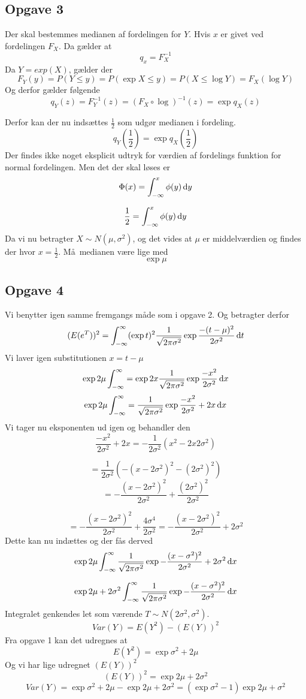 \subsection{Opgave 3}

Der skal bestemmes medianen af fordelingen for $Y$. Hvis $x$ er givet ved fordelingen $F_{X}$. Da g\ae lder at
\[
q_x = F_{X}^{-1}
\]
Da $Y = exp(X)$, g\ae lder der
\[
F_{Y}(y) = P(Y \leq y) = P(\exp{X} \leq y) = P(X \leq \log{Y}) = F_{X}(\log{Y})
\]
Og derfor g\ae lder f\o lgende
\[
q_{Y}(z) = F_{Y}^{-1}(z) = (F_{X} \circ \log)^{-1}(z) = \exp{q_{X}(z)} 
\]

Derfor kan der nu inds\ae ttes $\frac{1}{2}$ som udg\o r medianen i fordeling.
\[
q_{Y}(\frac{1}{2}) = \exp{q_{X}(\frac{1}{2})}
\]
Der findes ikke noget eksplicit udtryk for v\ae rdien af fordelings funktion for normal fordelingen. Men det der skal l\o ses er
\[
\Phi (x) = \int_{-\infty}^{x} \phi (y) \, \mathrm{d} y
\]

\[
\frac{1}{2} = \int_{-\infty}^{x} \phi(y) \, \mathrm{d} y
\]
Da vi nu betragter $X \sim N(\mu, \sigma^2)$, og det vides at $\mu$ er middelv\ae rdien og findes der hvor $x = \frac{1}{2}$. M\aa\ medianen v\ae re lige med
\[
\exp{\mu}
\]

\subsection{Opgave 4}

Vi benytter igen samme fremgangs m\aa de som i opgave 2. Og betragter derfor
\[
(E(e^{T}))^2 = \int_{-\infty}^{\infty} (\exp{t})^{2} \frac{1}{\sqrt{2\pi\sigma^{2}}} \exp{\frac{-(t - \mu)^{2}}{2\sigma^{2}}} \, \mathrm{d} t
\]
Vi laver igen substitutionen $x = t - \mu$
\[
\exp{2\mu} \int_{-\infty}^{\infty} = \exp{2x} \frac{1}{\sqrt{2\pi\sigma^{2}}} \exp{\frac{-x^{2}}{2\sigma^{2}}} \, \mathrm{d} x
\]
\[
\exp{2\mu} \int_{-\infty}^{\infty} = \frac{1}{\sqrt{2\pi\sigma^{2}}} \exp{\frac{-x^{2}}{2\sigma^{2}}+2x} \, \mathrm{d} x
\]
Vi tager nu eksponenten ud igen og behandler den
\[
\frac{-x^{2}}{2\sigma^{2}}+2x = -\frac{1}{2\sigma^2}\left( x^2 - 2x2\sigma^2 \right)
\]

\[
= \frac{1}{2\sigma^2}\left( -\left(x - 2\sigma^2 \right)^2 - \left( 2\sigma^2 \right)^2 \right)
\]
\[
= -\frac{(x - 2\sigma^2)^2}{2\sigma^2} + \frac{(2\sigma^2)^2}{2\sigma^2}
\]

\[
= -\frac{(x - 2\sigma^2)^2}{2\sigma^2} + \frac{4\sigma^4}{2\sigma^2} = -\frac{(x-2\sigma^2)^2}{2\sigma^2} + 2\sigma^2
\]
Dette kan nu ind\ae ttes og der f\aa s derved
\[
\exp{2\mu} \int_{-\infty}^{\infty} \frac{1}{\sqrt{2\pi\sigma^{2}}} \exp{-\frac{(x-\sigma^2)^2}{2\sigma^2} + 2\sigma^2} \, \mathrm{d} x
\]

\[
\exp{2\mu+2\sigma^2} \int_{-\infty}^{\infty} \frac{1}{\sqrt{2\pi\sigma^{2}}} \exp{-\frac{(x-\sigma^2)^2}{2\sigma^2}} \, \mathrm{d} x
\]
Integralet genkendes let som v\ae rende $T \sim N(2\sigma^2, \sigma^2)$.
\[
Var(Y) = E(Y^2) - (E(Y))^2
\]
Fra opgave 1 kan det udregnes at 
\[
E(Y^2) = \exp{\sigma^2 + 2\mu}
\]
Og vi har lige udregnet $(E(Y))^2$
\[
(E(Y))^2 = \exp{2\mu+2\sigma^2}
\]
\[
Var(Y) = \exp{\sigma^2 + 2\mu} - \exp{2\mu+2\sigma^2} = (\exp{\sigma^2} - 1)\exp{2\mu + \sigma^2}
\]
